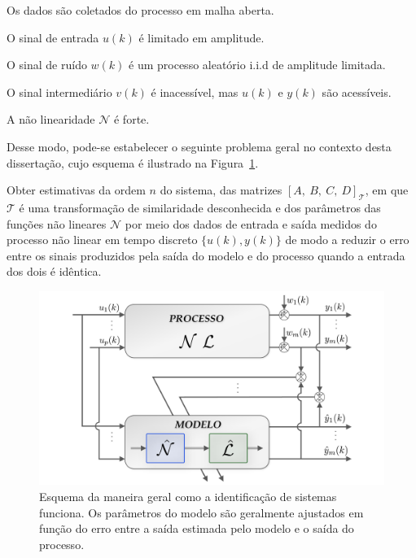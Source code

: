 \begin{suposicao}
	Os dados são coletados do processo em malha aberta.
	\label{sup:malha_aberta}
\end{suposicao}
\begin{suposicao}
	O sinal de entrada $u(k)$ é limitado em amplitude.
\end{suposicao}
\begin{suposicao}
	O sinal de ruído $w(k)$ é  um processo aleatório i.i.d de amplitude limitada.
\end{suposicao}
\begin{suposicao}
	O sinal intermediário ${v}(k)$ é inacessível, mas $u(k)$ e $y(k)$ são acessíveis.
\end{suposicao}
\begin{suposicao}
	A não linearidade $\mathcal{N}$ é forte.
\end{suposicao}

\par 
Desse modo, pode-se estabelecer o seguinte problema geral no contexto desta dissertação, cujo esquema é ilustrado na Figura~\ref{fig:cap1idconceito}.
\begin{problema}
	Obter estimativas da ordem $n$ do sistema, das matrizes $[A,~B,~C,~D]_{\mathcal{T}}$, em que $\mathcal{T}$ é uma transformação de similaridade desconhecida e dos parâmetros das funções não lineares $\mathcal{N}$ por meio dos dados de entrada e saída medidos do processo não linear em tempo discreto $\{u(k),y(k)\}$ de modo a reduzir o erro entre os sinais produzidos pela saída do modelo e do processo quando a entrada dos dois é idêntica.  
\end{problema}
%
\begin{figure}[h]
	\centering
	\includegraphics[width=0.9\linewidth]{figuras/cap1_idconceito}
	\caption[Esquema da maneira geral como a identificação de sistemas funciona.]{Esquema da maneira geral como a identificação de sistemas funciona. Os parâmetros do modelo são geralmente ajustados em função do erro entre a saída estimada pelo modelo e o saída do processo.}
	\label{fig:cap1idconceito}
\end{figure}
%

